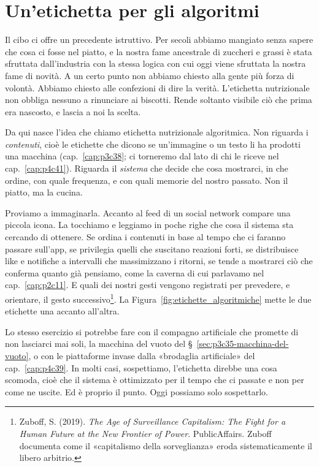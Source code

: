 \section{Un'etichetta per gli algoritmi}
\label{sec:p4c31-l-etichetta-sul}
Il cibo ci offre un precedente istruttivo. Per secoli abbiamo mangiato senza sapere che cosa ci fosse nel piatto, e la nostra fame ancestrale di zuccheri e grassi è stata sfruttata dall'industria con la stessa logica con cui oggi viene sfruttata la nostra fame di novità. A un certo punto non abbiamo chiesto alla gente più forza di volontà. Abbiamo chiesto alle confezioni di dire la verità. L'etichetta nutrizionale non obbliga nessuno a rinunciare ai biscotti. Rende soltanto visibile ciò che prima era nascosto, e lascia a noi la scelta.

Da qui nasce l'idea che chiamo etichetta nutrizionale algoritmica. Non riguarda i \textit{contenuti}, cioè le etichette che dicono se un'immagine o un testo li ha prodotti una macchina (cap.~\ref{cap:p3c38}; ci torneremo dal lato di chi le riceve nel cap.~\ref{cap:p4c41}). Riguarda il \textit{sistema} che decide che cosa mostrarci, in che ordine, con quale frequenza, e con quali memorie del nostro passato. Non il piatto, ma la cucina.

Proviamo a immaginarla. Accanto al feed di un social network compare una piccola icona. La tocchiamo e leggiamo in poche righe che cosa il sistema sta cercando di ottenere. Se ordina i contenuti in base al tempo che ci faranno passare sull'app, se privilegia quelli che suscitano reazioni forti, se distribuisce like e notifiche a intervalli che massimizzano i ritorni, se tende a mostrarci ciò che conferma quanto già pensiamo, come la caverna di cui parlavamo nel cap.~\ref{cap:p2c11}. E quali dei nostri gesti vengono registrati per prevedere, e orientare, il gesto successivo\footnote{Zuboff, S. (2019). \textit{The Age of Surveillance Capitalism: The Fight for a Human Future at the New Frontier of Power}. PublicAffairs. Zuboff documenta come il «capitalismo della sorveglianza» eroda sistematicamente il libero arbitrio.}. La Figura~\ref{fig:etichette_algoritmiche} mette le due etichette una accanto all'altra.


Lo stesso esercizio si potrebbe fare con il compagno artificiale che promette di non lasciarci mai soli, la macchina del vuoto del \S~\ref{sec:p3c35-macchina-del-vuoto}, o con le piattaforme invase dalla «brodaglia artificiale» del cap.~\ref{cap:p4c39}. In molti casi, sospettiamo, l'etichetta direbbe una cosa scomoda, cioè che il sistema è ottimizzato per il tempo che ci passate e non per come ne uscite. Ed è proprio il punto. Oggi possiamo solo sospettarlo.

